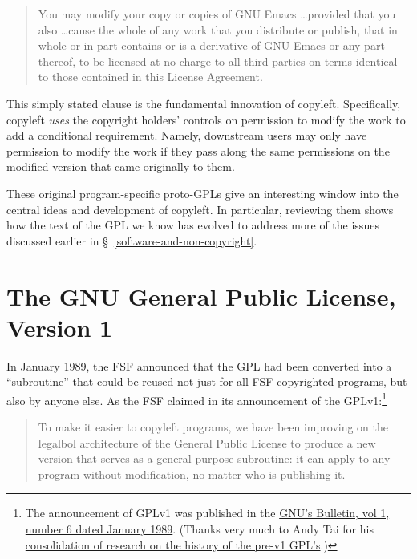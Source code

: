 \begin{quotation}
You may modify your copy or copies of GNU Emacs \ldots provided that you also
\ldots cause the whole of any work that you distribute or publish, that in
whole or in part contains or is a derivative of GNU Emacs or any part
thereof, to be licensed at no charge to all third parties on terms identical
to those contained in this License Agreement.
\end{quotation}

This simply stated clause is the fundamental innovation of copyleft.
Specifically, copyleft \textit{uses} the copyright holders' controls on
permission to modify the work to add a conditional requirement.  Namely,
downstream users may only have permission to modify  the work if they pass
along the same permissions on the modified version that came originally to
them.

These original program-specific proto-GPLs give an interesting window into
the central ideas and development of copyleft.  In particular, reviewing them
shows how the text of the GPL we know has evolved to address more of the
issues discussed earlier in \S~\ref{software-and-non-copyright}.

\section{The GNU General Public License, Version 1}
\label{GPLv1}

In January 1989, the FSF announced that the GPL had been converted into a
``subroutine'' that could be reused not just for all FSF-copyrighted
programs, but also by anyone else.  As the FSF claimed in its announcement of
the GPLv1:\footnote{The announcement of GPLv1 was published in the
  \href{http://www.gnu.org/bulletins/bull6.html\#SEC8}{GNU's Bulletin, vol 1,
    number 6 dated January 1989}.  (Thanks very much to Andy Tai for his
  \href{http://www.free-soft.org/gpl_history/}{consolidation of research on
    the history of the pre-v1 GPL's}.)}
\begin{quotation}
To make it easier to copyleft programs, we have been improving on the
legalbol architecture of the General Public License to produce a new version
that serves as a general-purpose subroutine: it can apply to any program
without modification, no matter who is publishing it.
\end{quotation}

